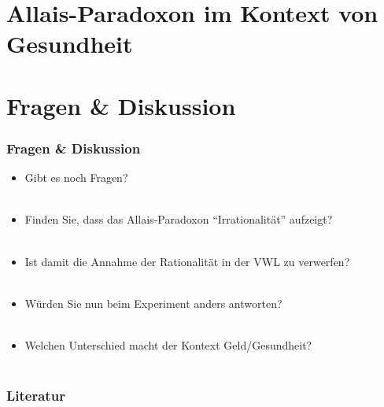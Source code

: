 \documentclass{beamer}
\begin{document}
\section{Allais-Paradoxon im Kontext von Gesundheit}

\section{Fragen \& Diskussion}

\begin{frame}
  \frametitle{Fragen \& Diskussion}
  \begin{itemize}
  \item<1> Gibt es noch Fragen?\\~\\
  \item<2-> Finden Sie, dass das Allais-Paradoxon "`Irrationalit\"at"' aufzeigt?\\~\\
  \item<2-> Ist damit die Annahme der Rationalit\"at in der VWL zu verwerfen?\\~\\
  \item<2-> W\"urden Sie nun beim Experiment anders antworten?\\~\\
  \item<2-> Welchen Unterschied macht der Kontext Geld/Gesundheit?\\~\\
    
  \end{itemize}
\end{frame}


\begin{frame}[allowframebreaks]
  \frametitle{Literatur}
  \printbibliography
\end{frame}
\end{document}
